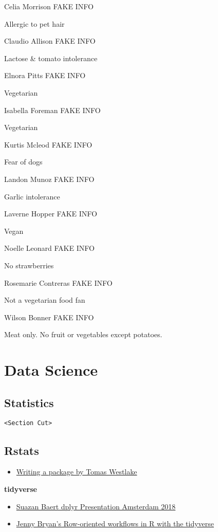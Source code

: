 \documentclass[]{book}
\providecommand{\tightlist}{%
  \setlength{\itemsep}{0pt}\setlength{\parskip}{0pt}}
\theoremstyle{definition}
\theoremstyle{definition}
\theoremstyle{definition}
\theoremstyle{remark}
\begin{document}
Celia Morrison FAKE INFO

Allergic to pet hair

Claudio Allison FAKE INFO

Lactose \& tomato intolerance

Elnora Pitts FAKE INFO

Vegetarian

Isabella Foreman FAKE INFO

Vegetarian

Kurtis Mcleod FAKE INFO

Fear of dogs

Landon Munoz FAKE INFO

Garlic intolerance

Laverne Hopper FAKE INFO

Vegan

Noelle Leonard FAKE INFO

No strawberries

Rosemarie Contreras FAKE INFO

Not a vegetarian food fan

Wilson Bonner FAKE INFO

Meat only. No fruit or vegetables except potatoes.

\chapter{Data Science}\label{data-science}

\section{Statistics}\label{statistics}

\texttt{\textless{}Section\ Cut\textgreater{}}

\section{Rstats}\label{rstats}

\begin{itemize}
\tightlist
\item
  \href{https://r-mageddon.netlify.com/post/writing-an-r-package-from-scratch/}{Writing
  a package by Tomas Westlake}
\end{itemize}

\textbf{tidyverse}

\begin{itemize}
\tightlist
\item
  \href{https://github.com/suzanbaert/SatRdaysAmsterdam18_dplyr}{Suazan
  Baert dplyr Presentation Amsterdam 2018}
\item
  \href{https://github.com/jennybc/row-oriented-workflows}{Jenny Bryan's
  Row-oriented workflows in R with the tidyverse}
\end{itemize}
\end{document}
